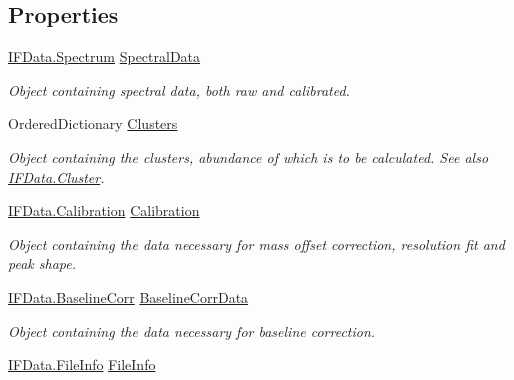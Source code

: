 \subsection*{Properties}
\begin{DoxyCompactItemize}
\item 
\hyperlink{class_isotope_fit_1_1_i_f_data_1_1_spectrum}{I\+F\+Data.\+Spectrum} \hyperlink{class_isotope_fit_1_1_workspace_a1d6cc2dd07cbfe920da9f1bffc9b32c2}{Spectral\+Data}
\begin{DoxyCompactList}\small\item\em Object containing spectral data, both raw and calibrated. \end{DoxyCompactList}\item 
Ordered\+Dictionary \hyperlink{class_isotope_fit_1_1_workspace_a13958fbe0adace21990cb1eabbd421e9}{Clusters}
\begin{DoxyCompactList}\small\item\em Object containing the clusters, abundance of which is to be calculated. See also \hyperlink{class_isotope_fit_1_1_i_f_data_1_1_cluster}{I\+F\+Data.\+Cluster}. \end{DoxyCompactList}\item 
\hyperlink{class_isotope_fit_1_1_i_f_data_1_1_calibration}{I\+F\+Data.\+Calibration} \hyperlink{class_isotope_fit_1_1_workspace_a0ed1cfd6701db24de84f4ba67eed0442}{Calibration}
\begin{DoxyCompactList}\small\item\em Object containing the data necessary for mass offset correction, resolution fit and peak shape. \end{DoxyCompactList}\item 
\hyperlink{class_isotope_fit_1_1_i_f_data_1_1_baseline_corr}{I\+F\+Data.\+Baseline\+Corr} \hyperlink{class_isotope_fit_1_1_workspace_a700395fbb329b1a0fcb5932095db066f}{Baseline\+Corr\+Data}
\begin{DoxyCompactList}\small\item\em Object containing the data necessary for baseline correction. \end{DoxyCompactList}\item 
\hyperlink{class_isotope_fit_1_1_i_f_data_1_1_file_info}{I\+F\+Data.\+File\+Info} \hyperlink{class_isotope_fit_1_1_workspace_a54c0025eccacbf519f619ef256414a92}{File\+Info}

\end{DoxyCompactItemize}
